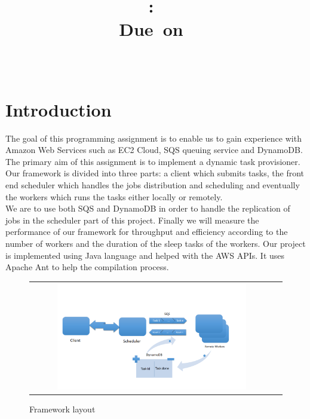 \documentclass{article}
\title{
\vspace{2in}
\textmd{\textbf{\hmwkClass:\ \hmwkTitle}}\\
\normalsize\vspace{0.1in}\small{Due\ on\ \hmwkDueDate}\\
\vspace{0.1in}\large{\textit{\hmwkClassInstructor\ \hmwkClassTime}}
\vspace{3in}
}
\author{\textbf{\hmwkAuthorName}}
\date{} %
\begin{document}
\maketitle



\newpage
\tableofcontents
\newpage



\section{Introduction}

The goal of this programming assignment is to enable us to gain experience with Amazon Web Services such as EC2 Cloud, SQS queuing service and DynamoDB. The primary aim of this assignment is to implement a dynamic task provisioner. Our framework is divided into three parts: a client which submits tasks, the front end scheduler which handles the jobs distribution and scheduling and eventually the workers which runs the tasks either locally or remotely.\\ 

We are to use both SQS and DynamoDB in order to handle the replication of jobs in the scheduler part of this project. Finally we will measure the performance of our framework for throughput and efficiency according to the number of workers and the duration of the sleep tasks of the workers. Our project is implemented using Java language and helped with the AWS APIs. It uses Apache Ant to help the compilation process.

\begin{figure}[H]
\centering
\begin{tabular}{cc}
\includegraphics[width=0.8\textwidth]{Presentation1.png}
\end{tabular}

\caption{Framework layout}

\end{figure}
\end{document}
